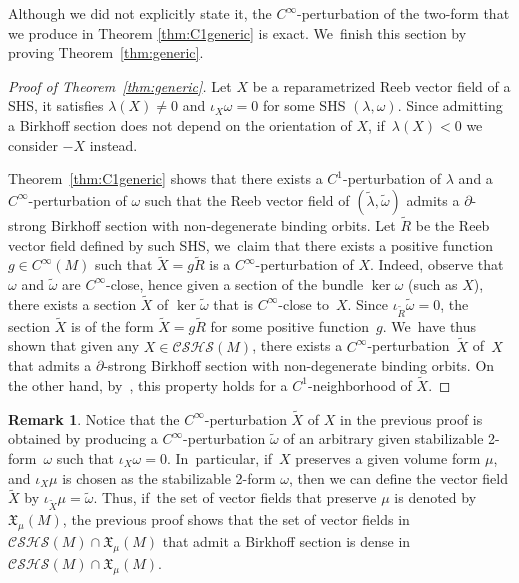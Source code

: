\documentclass[JEP,XML,SOM,Unicode,NoEqCountersInSection,NoFloatCountersInSection,published]{cedram}
\theoremstyle{definition}
\newtheorem{Remark}[theorem]{Remark}
\begin{document}
Although we did not explicitly state it, the $C^\infty$-perturbation of the two-form that we produce in Theorem \ref{thm:C1generic} is exact. We~finish this section by proving Theorem~\ref{thm:generic}.

\begin{proof}[Proof of Theorem~\ref{thm:generic}]
Let $X$ be a reparametrized Reeb vector field of a SHS, \ie it satisfies $\lambda(X)\neq 0$ and $\iota_X\omega=0$ for some SHS $(\lambda,\omega)$. Since admitting a Birkhoff section does not depend on the orientation of $X$, if~$\lambda(X)<0$ we consider $-X$ instead.

Theorem~\ref{thm:C1generic} shows that there exists a $C^1$-perturbation of $\lambda$ and a $C^\infty$-perturba\-tion of $\omega$ such that the Reeb vector field of $(\widetilde \lambda, \widetilde \omega)$ admits a $\partial$-strong Birkhoff section with non-degenerate binding orbits. Let $\widetilde R$ be the Reeb vector field defined by such SHS, we~claim that there exists a positive function $g\in C^\infty(M)$ such that $\widetilde X=g\widetilde R$ is a $C^\infty$\nobreakdash-perturbation of $X$. Indeed, observe that $\omega$ and $\widetilde \omega$ are $C^\infty$-close, hence given a section of the bundle $\ker \omega$ (such as $X$), there exists a section $\widetilde X$ of $\ker \widetilde \omega$ that is $C^\infty$-close to~$X$. Since $\iota_{\widetilde R}\widetilde \omega=0$, the section $\widetilde X$ is of the form $\widetilde X=g\widetilde R$ for some positive function~$g$. We~have thus shown that given any $X\in \mathcal{CSHS}(M)$, there exists a $C^\infty$-perturbation~$\widetilde X$ of~$X$ that admits a $\partial$-strong Birkhoff section with non-degenerate binding orbits. On the other hand, by~\cite[\S 5]{CDHR}, this property holds for a $C^1$-neighborhood of $\widetilde X$.
\end{proof}

\begin{Remark}\label{rem:fixvol}
Notice that the $C^\infty$-perturbation $\widetilde X$ of $X$ in the previous proof is obtained by producing a $C^\infty$-perturbation $\widetilde \omega$ of an arbitrary given stabilizable 2-form~$\omega$ such that $\iota_X\omega=0$. In~particular, if~$X$ preserves a given volume form $\mu$, and $\iota_X\mu$ is chosen as the stabilizable 2-form $\omega$, then we can define the vector field $\widetilde X$ by $\iota_{\widetilde X}\mu=\widetilde \omega$. Thus, if~the set of vector fields that preserve $\mu$ is denoted by $\mathfrak{X}_\mu(M)$, the previous proof shows that the set of vector fields in $\mathcal{CSHS}(M)\cap \mathfrak{X}_\mu(M)$ that admit a Birkhoff section is dense in $\mathcal{CSHS}(M)\cap \mathfrak{X}_\mu(M)$.
\end{Remark}
\end{document}
